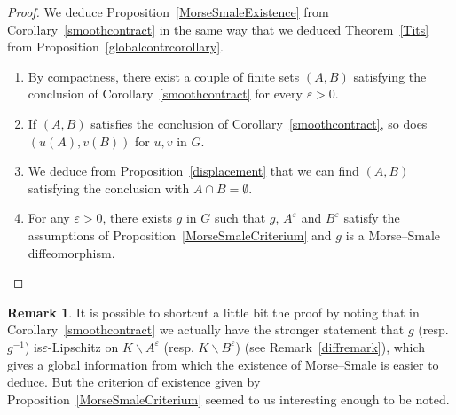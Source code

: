 \documentclass[10pt]{amsart}
\theoremstyle{definition}\newtheorem{defi}[theo]{Definition}\newtheorem{rema}[theo]{Remark}\newtheorem{exam}[theo]{Example}\newtheorem{exem}[theo]{Example}\newtheorem{nota}[theo]{Notation}
\newcommand{\ep}{\varepsilon}
\begin{document}
\begin{proof}
We deduce Proposition~\ref{MorseSmaleExistence} from Corollary~\ref{smoothcontract} in the same way that we deduced Theorem~\ref{Tits} from Proposition~\ref{globalcontrcorollary}.
\begin{enumerate}
\item By compactness, there exist a couple of finite sets $(A,B)$ satisfying the conclusion of Corollary~\ref{smoothcontract} for every $\ep>0$.
\item If $(A,B)$ satisfies the conclusion of Corollary~\ref{smoothcontract}, so does $(u(A),v(B))$ for $u,v$ in $G$.
\item We deduce from Proposition~\ref{displacement} that we can find $(A,B)$ satisfying the conclusion with $A\cap B=\emptyset$.
\item For any $\ep>0$, there exists $g$ in $G$ such that $g$, $A^\ep$ and $B^\ep$ satisfy the assumptions of Proposition~\ref{MorseSmaleCriterium} and $g$ is a Morse--Smale diffeomorphism.\qedhere
\end{enumerate}\let\qed\relax
\end{proof}


\begin{rema}
It is possible to shortcut a little bit the proof by noting that in Corollary~\ref{smoothcontract} we actually have the stronger statement that $g$ (resp. $g^{-1}$) is\linebreak $\ep$-Lipschitz on $K\backslash A^\ep$ (resp. $K\backslash B^\ep$) (see Remark~\ref{diffremark}), which gives a global information from which the existence of Morse--Smale is easier to deduce. But the criterion of existence given by Proposition~\ref{MorseSmaleCriterium} seemed to us interesting enough to be noted.
\end{rema}
\end{document}
